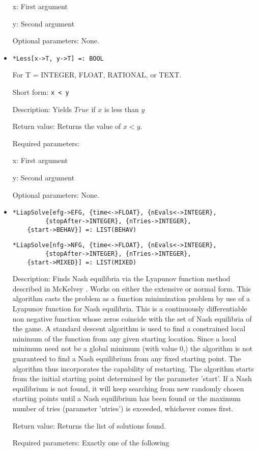 \begin{itemize}
\bd
\item
[x:] First argument
\item
[y:] Second argument
\ed

\item
[Optional parameters:] None.
\ed

\item
\protect \large \begin{verbatim}
*Less[x->T, y->T] =: BOOL
\end{verbatim}\normalsize

For T = INTEGER, FLOAT, RATIONAL, or TEXT.

\bd
\item
[Short form:] \verb+x < y+
\item
[Description:] Yields $True$ if $x$ is less than $y$
\item
[Return value:] Returns the value of $x < y$.
\item
[Required parameters:]\hfil\null

\bd
\item
[x:] First argument
\item
[y:] Second argument
\ed
\item
[Optional parameters:] None.
\ed

\item
\protect \large \begin{verbatim}
*LiapSolve[efg->EFG, {time<->FLOAT}, {nEvals<->INTEGER},
         {stopAfter->INTEGER}, {nTries->INTEGER}, 
	{start->BEHAV}] =: LIST(BEHAV)
\end{verbatim}\normalsize

\protect \large \begin{verbatim}
*LiapSolve[nfg->NFG, {time<->FLOAT}, {nEvals<->INTEGER},
         {stopAfter->INTEGER}, {nTries->INTEGER},
	{start->MIXED}] =: LIST(MIXED)
\end{verbatim}\normalsize


\bd
\item
[Description:] Finds Nash equilibria via the Lyapunov function method
described in McKelvey \cite[1991]{McK:91}.  Works on either the
extensive or normal form.  This algorithm casts the problem as a
function minimization problem by use of a Lyapunov function for Nash
equilibria.  This is a continuously differentiable non negative
function whose zeros coincide with the set of Nash equilibria of the
game.  A standard descent algorithm is used to find a constrained
local minimum of the function from any given starting location.  Since
a local minimum need not be a global minimum (with value 0,) the
algorithm is not guaranteed to find a Nash equilibrium from any fixed
starting point.  The algorithm thus incorporates the capability of
restarting.  The algorithm starts from the initial starting point
determined by the parameter 'start'.  If a Nash equilibrium is not
found, it will keep searching from new randomly chosen starting points
until a Nash equilibrium has been found or the maximum number of tries
(parameter 'ntries') is exceeded, whichever comes first.
\item
[Return value:] Returns the list of solutions found.
\item
[Required parameters:] Exactly one of the following \hfil\null


\end{itemize}
